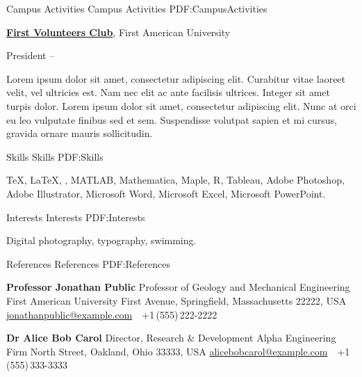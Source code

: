 \documentclass[letterpaper,MMMyyyy,nonstopmode]{simpleresumecv}
\begin{document}
\begin{Body}
\newpage


\Section
{Campus Activities}
{Campus Activities}
{PDF:CampusActivities}

\Entry
\href{http://www.example.com/my-club}
{\textbf{First Volunteers Club}},
First American University

\Gap
\BulletItem
President
\hfill
{} --
\begin{Detail}
\SubBulletItem
Lorem ipsum dolor sit amet, consectetur adipiscing elit.
\SubBulletItem
Curabitur vitae laoreet velit, vel ultricies est. Nam nec elit ac ante facilisis ultrices.
\SubBulletItem
Integer sit amet turpis dolor. Lorem ipsum dolor sit amet, consectetur adipiscing elit. Nunc at orci eu leo vulputate finibus sed et sem.
\SubBulletItem
Suspendisse volutpat sapien et mi cursus, gravida ornare mauris sollicitudin.
\end{Detail}


\Section
{Skills}
{Skills}
{PDF:Skills}

\Entry
{\TeX}, {\LaTeX}, {\XeLaTeX},
MATLAB,
Mathematica,
Maple,
R,
Tableau,
Adobe Photoshop,
Adobe Illustrator,
Microsoft Word,
Microsoft Excel,
Microsoft PowerPoint.


\Section
{Interests}
{Interests}
{PDF:Interests}

\Entry
Digital photography,
typography,
swimming.


\Section
{References}
{References}
{PDF:References}

\BulletItem
\textbf{Professor Jonathan Public}
\newline
Professor of Geology and Mechanical Engineering
\newline
First American University
 First Avenue, Springfield, Massachusetts 22222, USA
\newline
\href{mailto:jonathanpublic@example.com}
{jonathanpublic@example.com}
\,\SubBulletSymbol\,
+1\,(555)\,222-2222

\BigGap
\BulletItem
\textbf{Dr Alice Bob Carol}
\newline
Director, Research \& Development
\newline
Alpha Engineering Firm
 North Street, Oakland, Ohio 33333, USA
\newline
\href{mailto:alicebobcarol@example.com}
{alicebobcarol@example.com}
\,\SubBulletSymbol\,
+1\,(555)\,333-3333


\end{Body}
\end{document}
